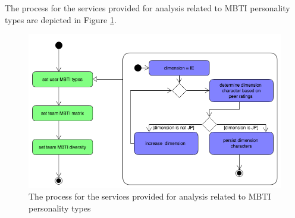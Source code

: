 The process for the services provided for analysis related to MBTI  personality types are depicted in Figure \ref{fig:mbti_process}.

\begin{figure}[htb]
\begin{center}
\includegraphics[width=\textwidth,keepaspectratio=true]{mbti_process}
\end{center}
\caption{ The process for the services provided for analysis related to MBTI personality types \label{fig:mbti_process}}
\end{figure}
